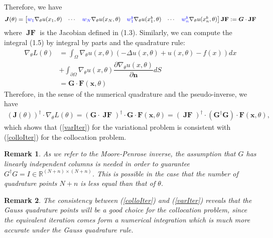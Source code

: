 \documentclass[a4paper, 11pt]{article}
\numberwithin{equation}{section}
\newtheorem{remark}{\textbf{Remark}}
\begin{document}
Therefore, we have 
\begin{align}
 \boldsymbol{J}(\theta) =
  \begin{bmatrix}
  {\color{blue}w_1} \nabla_{\theta} u(x_1,\theta)  & \cdots & {\color{blue}w_N} \nabla_{\theta}u(x_N,\theta)  & 
{\color{blue}w^b_1} \nabla_{\theta}  u(x^b_1,\theta)  & \cdots &
{\color{blue}w^b_n} \nabla_{\theta}  u(x^b_n,\theta) 
  \end{bmatrix}
\boldsymbol{\operatorname{JF}}  :=\boldsymbol{G} \cdot \boldsymbol{\operatorname{JF}} 
\end{align}
where $\boldsymbol{\operatorname{JF}} $ is the Jacobian defined in (1.3). Similarly, we can compute the integral (1.5) by integral by parts and the quadrature rule:
\begin{align}
\nabla_{\theta} L(\theta) &= \int_{\Omega}\nabla_{\theta} u(x,\theta) \left( -\Delta u(x,\theta) + u(x,\theta) -f(x) \right)   dx \\ 
&+ \int_{\partial \Omega}\nabla_{\theta} u(x,\theta)  \dfrac{\partial \nabla_{\theta}u(x,\theta) }{\partial \boldsymbol{n}} dS \\ 
&= \boldsymbol{G}\cdot \boldsymbol{F}(\boldsymbol{x},\theta) 
\end{align}
Therefore, in the sense of the numerical quadrature and the pseudo-inverse, we have
\begin{align}
(\boldsymbol{J} (\theta))^{\dagger} \cdot \nabla_{\theta} L(\theta) = (\boldsymbol{G} \cdot \boldsymbol{\operatorname{JF}} )^{\dagger}\cdot \boldsymbol{G}\cdot \boldsymbol{F}(\boldsymbol{x},\theta)  = (\boldsymbol{\operatorname{JF}})^{\dagger}\cdot (\boldsymbol{G}^{\dagger} \boldsymbol{G}) \cdot \boldsymbol{F}(\boldsymbol{x},\theta),
\end{align}
which shows that (\ref{varIter}) for the variational problem is consistent with (\ref{colloIter}) for the collocation problem. 

\begin{remark}
As we refer to the Moore-Penrose inverse, the assumption that $G$ has linearly independent columns is needed in  order to guarantee $G^{\dagger} G = I \in \mathbb{R}^{(N+n)\times (N+n)}$. This is possible in the case that the number of quadrature points $N+n$ is less equal than that of $\theta$. 
\end{remark}

\begin{remark}
The consistency between (\ref{colloIter}) and (\ref{varIter}) reveals that the Gauss quadrature points will be a good choice for the collocation problem, since the equivalent iteration comes form a numerical integration which is much more accurate under the Gauss quadrature rule.
\end{remark}
\end{document}
